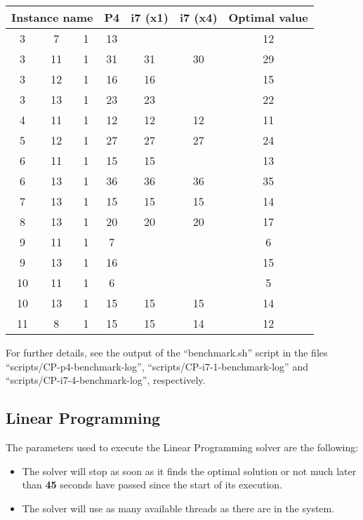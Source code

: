 \begin{table}[H]
\centering
	\begin{tabular}{ccccccc}
		\multicolumn{3}{c}{Instance name}
					& P4		& i7 (x1)	& i7 (x4)	& Optimal value \\
		\midrule
		 3 &  7 & 1	& 13		&  			&  			& 12 \\
		 3 & 11 & 1	& 31		&  31		& 30			& 29 \\
		 3 & 12 & 1	& 16		&  16		&  			& 15 \\
		 3 & 13 & 1	& 23		&  23		&  			& 22 \\
		 4 & 11 & 1	& 12		&  12		& 12			& 11 \\
		 5 & 12 & 1	& 27		&  27		& 27			& 24 \\
		 6 & 11 & 1	& 15		&  15		&  			& 13 \\
		 6 & 13 & 1	& 36		&  36		& 36			& 35 \\
		 7 & 13 & 1	& 15		&  15		& 15			& 14 \\
		 8 & 13 & 1	& 20		&  20		& 20			& 17 \\
		 9 & 11 & 1	&  7		&   			&  			&  6 \\
		 9 & 13 & 1	& 16		&   			&  			& 15 \\
		10 & 11 & 1	&  6		&   			&  			&  5 \\
		10 & 13 & 1	& 15		&  15		& 15			& 14 \\
		11 &  8 & 1	& 15		&  15		& 14			& 12 \\
	\end{tabular}
	\label{table:CP-results:suboptimalinstances}
\end{table}

For further details, see the output of the ``benchmark.sh'' script in the files
``scripts/CP-p4-benchmark-log'', ``scripts/CP-i7-1-benchmark-log'' and
``scripts/CP-i7-4-benchmark-log'', respectively.

\subsection{Linear Programming}
\label{sec:benchmarking:linear-programming}

The parameters used to execute the Linear Programming solver are the following:
\begin{itemize}
	\item The solver will stop as soon as it finds the optimal solution or not much
	later than \textbf{45} seconds have passed since the start of its execution.
	\item The solver will use as many available threads as there are in the system.
\end{itemize}

